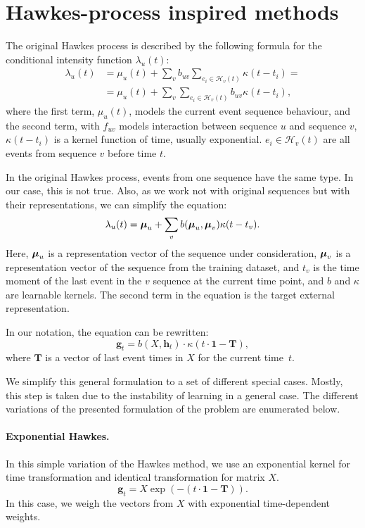 \section{Hawkes-process inspired methods}
\label{sec:hawkes_insprired_methods}

The original Hawkes process is described by the following formula for the conditional intensity function $\lambda_u(t)$:
\begin{align*}
\lambda_u(t) &=
\mu_u(t) + \sum_{v} b_{uv} \sum_{e_i \in \mathcal{H}_v(t)} \kappa(t-t_i) = \\
&= \mu_u(t) + \sum_{v} \sum_{e_i \in \mathcal{H}_v(t)} b_{uv}  \kappa(t-t_i),
\end{align*}
where the first term, $\mu_u(t)$, models the current event sequence behaviour, and the second term, with $f_{uv}$ models interaction between sequence $u$ and sequence $v$,  $\kappa(t - t_i)$ is a kernel function of time, usually exponential. $e_i \in \mathcal{H}_v(t)$ are all events from sequence $v$ before time $t$. 

In the original Hawkes process, events from one sequence have the same type. In our case, this is not true. Also, as we work not with original sequences but with their representations, we can simplify the equation:
\[
\lambda_u(t) = \boldsymbol{\mu}_u + \sum_{v} b(\boldsymbol{\mu}_u, \boldsymbol{\mu}_v) \kappa(t - t_v).
\]
Here, $\boldsymbol{\mu}_u$ is a representation vector of the sequence under consideration, $\boldsymbol{\mu}_v$ is a representation vector of the sequence from the training dataset,  and $t_v$ is the time moment of the last event in the $v$ sequence at the current time point, and $b$ and $\kappa$ are learnable kernels. The second term in the equation is the target external representation. 

In our notation, the equation can be rewritten:
\[
     \mathbf{g}_t = b(X, \mathbf{h}_t)\cdot \kappa(t \cdot \mathbf{1} - \mathbf{T}),
\]
where $\mathbf{T}$ is a vector of  last event times in $X$ for the current time~$t$.

We simplify this general formulation to a set of different special cases. 
Mostly, this step is taken due to the instability of learning in a general case.
The different variations of the presented formulation of the problem are enumerated below.

\paragraph{Exponential Hawkes.} In this simple variation of the Hawkes method, we use an exponential kernel for time transformation and identical transformation for matrix $X$.
\begin{equation}
     \mathbf{g}_t = X \exp{(-(t \cdot \mathbf{1} - \mathbf{T}))}.
\end{equation}
In this case, we weigh the vectors from $X$ with exponential time-dependent weights.

